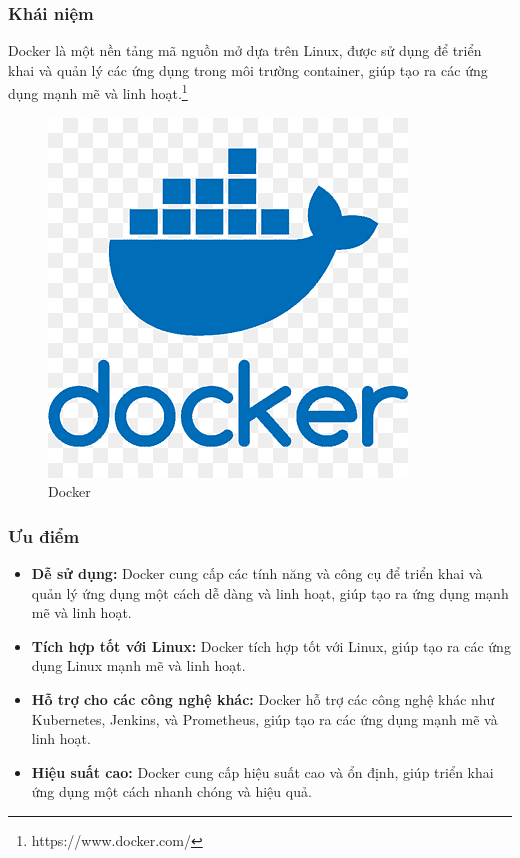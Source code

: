 \subsubsection{Khái niệm}
\noindent Docker là một nền tảng mã nguồn mở dựa trên Linux, được sử dụng để triển khai và quản lý các ứng dụng trong môi trường container, giúp tạo ra các ứng dụng mạnh mẽ và linh hoạt.\footnote{https://www.docker.com/}
\begin{figure}[H]
  \begin{center}
    \includegraphics[scale=0.35]{images/hieu/phuluc/docker.png}
    \caption{Docker}
  \end{center}
\end{figure}
\subsubsection{Ưu điểm}
\begin{itemize}
  \item \textbf{Dễ sử dụng:} Docker cung cấp các tính năng và công cụ để triển khai và quản lý ứng dụng một cách dễ dàng và linh hoạt, giúp tạo ra ứng dụng mạnh mẽ và linh hoạt.
  \item \textbf{Tích hợp tốt với Linux:} Docker tích hợp tốt với Linux, giúp tạo ra các ứng dụng Linux mạnh mẽ và linh hoạt.
  \item \textbf{Hỗ trợ cho các công nghệ khác:} Docker hỗ trợ các công nghệ khác như Kubernetes, Jenkins, và Prometheus, giúp tạo ra các ứng dụng mạnh mẽ và linh hoạt.
  \item \textbf{Hiệu suất cao:} Docker cung cấp hiệu suất cao và ổn định, giúp triển khai ứng dụng một cách nhanh chóng và hiệu quả.
\end{itemize}
